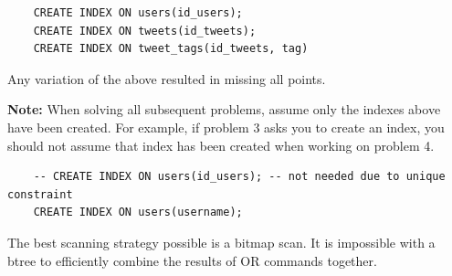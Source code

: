 \documentclass[12pt]{exam}
\theoremstyle{definition}
\begin{document}
\begin{questions}
\begin{solution}
    \begin{lstlisting}
    CREATE INDEX ON users(id_users);
    CREATE INDEX ON tweets(id_tweets);
    CREATE INDEX ON tweet_tags(id_tweets, tag)
    \end{lstlisting}
    Any variation of the above resulted in missing all points.
\end{solution}

    \textbf{Note:}
    When solving all subsequent problems,
    assume only the indexes above have been created.
    For example, if problem 3 asks you to create an index,
    you should not assume that index has been created when working on problem 4.

\newpage
{}

\begin{solution}
    \begin{lstlisting}
    -- CREATE INDEX ON users(id_users); -- not needed due to unique constraint
    CREATE INDEX ON users(username);
    \end{lstlisting}
    The best scanning strategy possible is a bitmap scan.
    It is impossible with a btree to efficiently combine the results of OR commands together.
\end{solution}

%
%


\end{questions}
\end{document}
